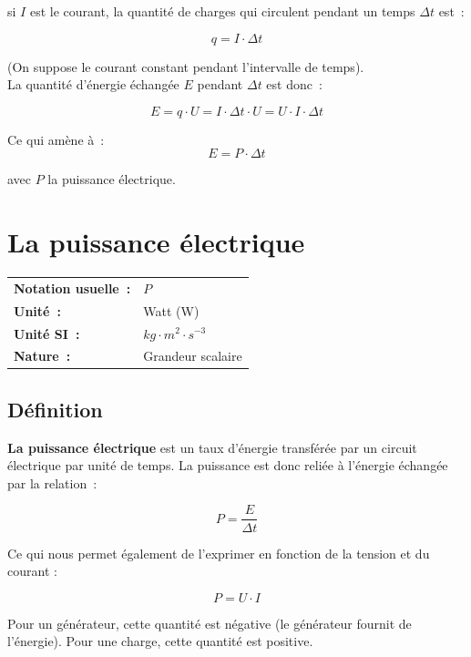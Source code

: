 si $I$ est le courant, la quantité de charges qui circulent pendant un temps $\Delta t$ est~: 

$$q = I \cdot \Delta t$$

(On suppose le courant constant pendant l'intervalle de temps).\\

La quantité d'énergie échangée $E$ pendant $\Delta t$ est donc~:

$$ E = q \cdot U = I \cdot \Delta t \cdot U = U \cdot I \cdot \Delta t $$

Ce qui amène à~: \\
\begin{equation}
E = P \cdot \Delta t 
\end{equation}

avec $P$ la puissance électrique.

\section{La puissance électrique}

\begin{tabular}{ll}
\textbf{Notation usuelle~:} & $P$ \\
\textbf{Unité~:} & Watt (W) \\
	\textbf{Unité SI~:} & $kg \cdot m^2 \cdot s^{-3}$ \\
\textbf{Nature~:} & Grandeur scalaire \\
\end{tabular} 

\subsection*{Définition}

\textbf{La puissance électrique} est un taux d'énergie transférée par un circuit électrique par unité de temps. La puissance est donc reliée à l'énergie échangée par la relation~:

\begin{equation}
	P = \dfrac{E}{\Delta t}
\end{equation}

Ce qui nous permet également de l'exprimer en fonction de la tension et du courant :

\begin{equation}
	P = U \cdot I
\end{equation}

Pour un générateur, cette quantité est négative (le générateur fournit de l'énergie). Pour une charge, cette quantité est positive.

